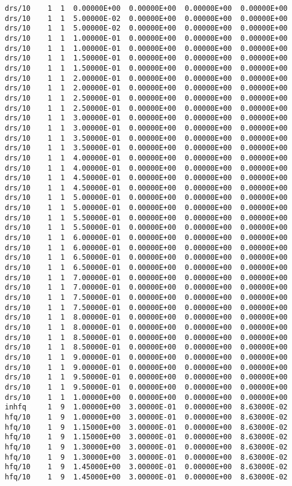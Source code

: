 \begin{footnotesize}
\begin{verbatim}
drs/10    1  1  0.00000E+00  0.00000E+00  0.00000E+00  0.00000E+00
drs/10    1  1  5.00000E-02  0.00000E+00  0.00000E+00  0.00000E+00
drs/10    1  1  5.00000E-02  0.00000E+00  0.00000E+00  0.00000E+00
drs/10    1  1  1.00000E-01  0.00000E+00  0.00000E+00  0.00000E+00
drs/10    1  1  1.00000E-01  0.00000E+00  0.00000E+00  0.00000E+00
drs/10    1  1  1.50000E-01  0.00000E+00  0.00000E+00  0.00000E+00
drs/10    1  1  1.50000E-01  0.00000E+00  0.00000E+00  0.00000E+00
drs/10    1  1  2.00000E-01  0.00000E+00  0.00000E+00  0.00000E+00
drs/10    1  1  2.00000E-01  0.00000E+00  0.00000E+00  0.00000E+00
drs/10    1  1  2.50000E-01  0.00000E+00  0.00000E+00  0.00000E+00
drs/10    1  1  2.50000E-01  0.00000E+00  0.00000E+00  0.00000E+00
drs/10    1  1  3.00000E-01  0.00000E+00  0.00000E+00  0.00000E+00
drs/10    1  1  3.00000E-01  0.00000E+00  0.00000E+00  0.00000E+00
drs/10    1  1  3.50000E-01  0.00000E+00  0.00000E+00  0.00000E+00
drs/10    1  1  3.50000E-01  0.00000E+00  0.00000E+00  0.00000E+00
drs/10    1  1  4.00000E-01  0.00000E+00  0.00000E+00  0.00000E+00
drs/10    1  1  4.00000E-01  0.00000E+00  0.00000E+00  0.00000E+00
drs/10    1  1  4.50000E-01  0.00000E+00  0.00000E+00  0.00000E+00
drs/10    1  1  4.50000E-01  0.00000E+00  0.00000E+00  0.00000E+00
drs/10    1  1  5.00000E-01  0.00000E+00  0.00000E+00  0.00000E+00
drs/10    1  1  5.00000E-01  0.00000E+00  0.00000E+00  0.00000E+00
drs/10    1  1  5.50000E-01  0.00000E+00  0.00000E+00  0.00000E+00
drs/10    1  1  5.50000E-01  0.00000E+00  0.00000E+00  0.00000E+00
drs/10    1  1  6.00000E-01  0.00000E+00  0.00000E+00  0.00000E+00
drs/10    1  1  6.00000E-01  0.00000E+00  0.00000E+00  0.00000E+00
drs/10    1  1  6.50000E-01  0.00000E+00  0.00000E+00  0.00000E+00
drs/10    1  1  6.50000E-01  0.00000E+00  0.00000E+00  0.00000E+00
drs/10    1  1  7.00000E-01  0.00000E+00  0.00000E+00  0.00000E+00
drs/10    1  1  7.00000E-01  0.00000E+00  0.00000E+00  0.00000E+00
drs/10    1  1  7.50000E-01  0.00000E+00  0.00000E+00  0.00000E+00
drs/10    1  1  7.50000E-01  0.00000E+00  0.00000E+00  0.00000E+00
drs/10    1  1  8.00000E-01  0.00000E+00  0.00000E+00  0.00000E+00
drs/10    1  1  8.00000E-01  0.00000E+00  0.00000E+00  0.00000E+00
drs/10    1  1  8.50000E-01  0.00000E+00  0.00000E+00  0.00000E+00
drs/10    1  1  8.50000E-01  0.00000E+00  0.00000E+00  0.00000E+00
drs/10    1  1  9.00000E-01  0.00000E+00  0.00000E+00  0.00000E+00
drs/10    1  1  9.00000E-01  0.00000E+00  0.00000E+00  0.00000E+00
drs/10    1  1  9.50000E-01  0.00000E+00  0.00000E+00  0.00000E+00
drs/10    1  1  9.50000E-01  0.00000E+00  0.00000E+00  0.00000E+00
drs/10    1  1  1.00000E+00  0.00000E+00  0.00000E+00  0.00000E+00
inhfq     1  9  1.00000E+00  3.00000E-01  0.00000E+00  8.63000E-02
hfq/10    1  9  1.00000E+00  3.00000E-01  0.00000E+00  8.63000E-02
hfq/10    1  9  1.15000E+00  3.00000E-01  0.00000E+00  8.63000E-02
hfq/10    1  9  1.15000E+00  3.00000E-01  0.00000E+00  8.63000E-02
hfq/10    1  9  1.30000E+00  3.00000E-01  0.00000E+00  8.63000E-02
hfq/10    1  9  1.30000E+00  3.00000E-01  0.00000E+00  8.63000E-02
hfq/10    1  9  1.45000E+00  3.00000E-01  0.00000E+00  8.63000E-02
hfq/10    1  9  1.45000E+00  3.00000E-01  0.00000E+00  8.63000E-02



\end{verbatim}
\end{footnotesize}
